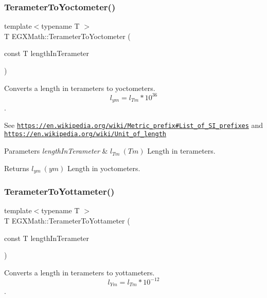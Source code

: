 \subsubsection{\texorpdfstring{Terameter\+To\+Yoctometer()}{TerameterToYoctometer()}}
{\footnotesize\ttfamily template$<$typename T $>$ \\
T E\+G\+X\+Math\+::\+Terameter\+To\+Yoctometer (\begin{DoxyParamCaption}\item[{const T}]{length\+In\+Terameter }\end{DoxyParamCaption})}



Converts a length in terameters to yoctometers. \[ l_{ym}=l_{Tm} * 10^{36} \]. 

See \href{https://en.wikipedia.org/wiki/Metric_prefix#List_of_SI_prefixes}{\tt https\+://en.\+wikipedia.\+org/wiki/\+Metric\+\_\+prefix\#\+List\+\_\+of\+\_\+\+S\+I\+\_\+prefixes} and \href{https://en.wikipedia.org/wiki/Unit_of_length}{\tt https\+://en.\+wikipedia.\+org/wiki/\+Unit\+\_\+of\+\_\+length} 
\begin{DoxyParams}{Parameters}
{\em length\+In\+Terameter} & $ l_{Tm}\ (Tm)$ Length in terameters. \\
\hline
\end{DoxyParams}
\begin{DoxyReturn}{Returns}
$ l_{ym}\ (ym)$ Length in yoctometers. 
\end{DoxyReturn}
\mbox{\label{group___e_g_x_math-_conversions-_length_conversions-_s_i-_terameter-_s_i_gab0411fd993ebfe0b23de8d672203f68e}} 
\subsubsection{\texorpdfstring{Terameter\+To\+Yottameter()}{TerameterToYottameter()}}
{\footnotesize\ttfamily template$<$typename T $>$ \\
T E\+G\+X\+Math\+::\+Terameter\+To\+Yottameter (\begin{DoxyParamCaption}\item[{const T}]{length\+In\+Terameter }\end{DoxyParamCaption})}



Converts a length in terameters to yottameters. \[ l_{Ym}=l_{Tm} * 10^{-12} \]. 

